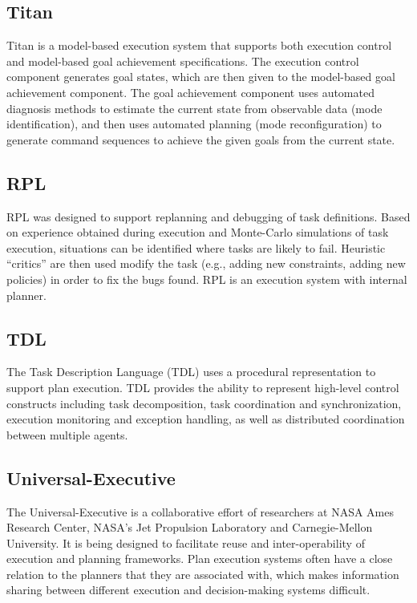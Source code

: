 \documentclass[conference]{IEEEtran}
\begin{document}
\subsection{\textbf{Titan}}\label{sec:titan}
Titan is a model-based execution system that supports both execution control and model-based goal achievement specifications. The execution control component generates goal states, which are then given to the model-based goal achievement component. The goal achievement component uses automated diagnosis methods to estimate the current state from observable data (mode identification), and then uses automated planning (mode reconfiguration) to generate command sequences to achieve the given goals from the current state.

\subsection{\textbf{RPL}}\label{sec:rpl}
RPL was designed to support replanning and debugging of task definitions. Based on experience obtained during execution and Monte-Carlo simulations of task execution, situations can be identified where tasks are likely to fail. Heuristic “critics” are then used modify the task (e.g., adding new constraints, adding new policies) in order to fix the bugs found. RPL is an execution system with internal planner.

\subsection{\textbf{TDL}}\label{sec:tdl}
The Task Description Language (TDL) uses a procedural representation to support plan execution.
TDL provides the ability to represent high-level control constructs including task decomposition, task coordination and synchronization, execution monitoring and exception handling, as well as distributed coordination between multiple agents.

\subsection{\textbf{Universal-Executive}}\label{sec:universal}
The Universal-Executive is a collaborative effort of researchers at NASA Ames Research Center, NASA’s Jet Propulsion Laboratory and Carnegie-Mellon University. It is being designed to facilitate reuse and inter-operability of execution and planning frameworks. Plan execution systems often have a close relation to the planners that they are associated with, which makes information sharing between different execution and decision-making systems difficult.
\end{document}
